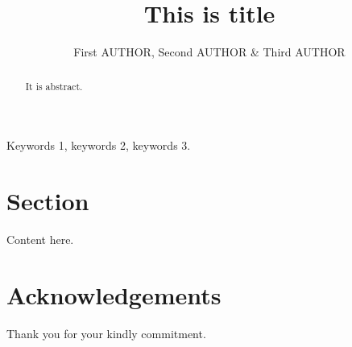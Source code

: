 ﻿\documentclass[11pt,a4paper]{article}
\title{This is title}
\author{First AUTHOR\inst{a}\correspond,
Second AUTHOR\inst{a} \&
Third AUTHOR\inst{a}}
\begin{document}
\maketitle

\begin{abstract}
	It is abstract.
\end{abstract}

\begin{keywords}
	Keywords 1, keywords 2, keywords 3.
\end{keywords}

\section{Section}

Content here.

\section*{Acknowledgements}

Thank you for your kindly commitment.

\printbibliography
\end{document}
